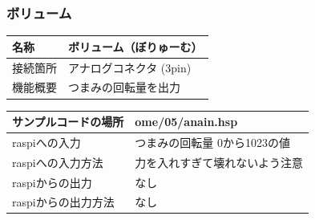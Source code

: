 \subsubsection{ボリューム}\label{volume}
\begin{table}[H]
	\begin{tabular}{|p{\colF}|p{\colG}|}	\hline
	名称 & ボリューム（ぼりゅーむ）\\ \hline
	接続箇所 & アナログコネクタ (3pin)\\ \hline
	機能概要 & つまみの回転量を出力\\ \hline
  \end{tabular}
\end{table}

\begin{table}[H]
	\begin{tabular}{|p{\colF}|p{\colG}|}	\hline
	サンプルコードの場所 & ome/05/anain.hsp\\ \hline
	raspiへの入力 & つまみの回転量 0から1023の値\\ \hline
	raspiへの入力方法 & 力を入れすぎて壊れないよう注意\\ \hline
	raspiからの出力 & なし\\ \hline
	raspiからの出力方法 & なし\\ \hline
  \end{tabular}
\end{table}

